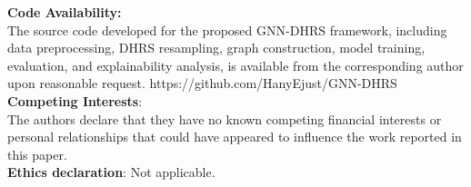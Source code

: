 \documentclass[pdflatex,sn-mathphys-num]{sn-jnl}%
\theoremstyle{thmstyleone}%
\theoremstyle{thmstyletwo}%
\theoremstyle{thmstylethree}%
\begin{document}
{\noindent \textbf{Code Availability:}\\
 {
The source code developed for the proposed GNN-DHRS framework, including
data preprocessing, DHRS resampling, graph construction, model training,
evaluation, and explainability analysis, is available from the corresponding
author upon reasonable request. https://github.com/HanyEjust/GNN-DHRS
} \\



\noindent \textbf{Competing Interests}:  \\
The authors declare that they have no known competing financial interests or personal relationships that could have appeared to influence the work reported in this paper. \\

\noindent \textbf{Ethics declaration}: Not applicable.







}
\end{document}
